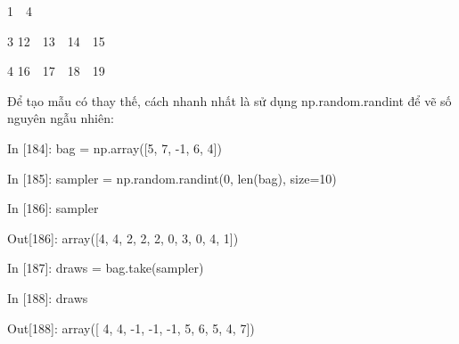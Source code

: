     \quad\textup{1\ \    4 }\par
    \quad\textup{3  12\ \  13\ \  14\ \  15   }\par
    \quad\textup{4  16\ \  17\ \  18\ \  19}\par
Để tạo mẫu có thay thế, cách nhanh nhất là sử dụng np.random.randint để 
vẽ số nguyên ngẫu nhiên:\par
    \quad\textup{In [184]: bag = np.array([5, 7, -1, 6, 4])  }\par
    \quad\textup{In [185]: sampler = np.random.randint(0, len(bag), size=10) }\par
    \quad\textup{In [186]: sampler }\par
    \quad\textup{Out[186]: array([4, 4, 2, 2, 2, 0, 3, 0, 4, 1]) }\par
    \quad\textup{In [187]: draws = bag.take(sampler) }\par
    \quad\textup{In [188]: draws }\par
    \quad\textup{Out[188]: array([ 4,  4, -1, -1, -1,  5,  6,  5,  4,  7])}\par
    


%
